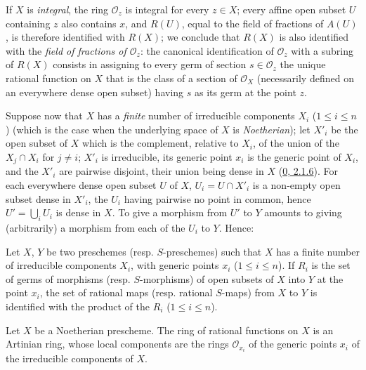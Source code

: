 If $X$ is \emph{integral}, the ring $\mathscr{O}_z$ is integral for every
$z\in X$; every affine open subset $U$ containing $z$ also contains $x$, and
$R(U)$, equal to the field of fractions of $A(U)$, is therefore identified
with $R(X)$; we conclude that $R(X)$ is also identified with the
\emph{field of fractions of $\mathscr{O}_z$}: the canonical identification of
$\mathscr{O}_z$ with a subring of $R(X)$ consists in assigning to every germ of
section $s\in\mathscr{O}_z$ the unique rational function on $X$ that is the
class of a section of $\mathscr{O}_X$ (necessarily defined on an everywhere
dense open subset) having $s$ as its germ at the point $z$.

\begin{env}[7.1.6]
\label{I.7.1.6}
Suppose now that $X$ has a \emph{finite} number of irreducible components
$X_i$ ($1\leq i\leq n$) (which is the case when the underlying space of $X$
is \emph{Noetherian}); let $X'_i$ be the open subset of $X$ which is the
complement, relative to $X_i$, of the union of the $X_j\cap X_i$ for
$j\neq i$; $X'_i$ is irreducible, its generic point $x_i$ is the generic point
of $X_i$, and the $X'_i$ are pairwise disjoint, their union being dense in $X$
(\hyperref[0.2.1.6]{0, 2.1.6}). For
each everywhere dense open subset $U$ of $X$, $U_i=U\cap X'_i$ is a non-empty
open subset dense in $X'_i$, the $U_i$ having pairwise no point in common,
hence $U'=\bigcup_i U_i$ is dense in $X$. To give a morphism from $U'$ to $Y$
amounts to giving (arbitrarily) a morphism from each of the $U_i$ to $Y$.
Hence:
\end{env}

\begin{proposition}[7.1.7]
\label{I.7.1.7}
Let $X$, $Y$ be two preschemes (resp. $S$-preschemes) such that $X$ has a
finite number of irreducible components $X_i$, with generic points $x_i$
($1\leq i\leq n$). If $R_i$ is the set of germs of morphisms (resp.
$S$-morphisms) of open subsets of $X$ into $Y$ at the point $x_i$, the set of
rational maps (resp. rational $S$-maps) from $X$ to $Y$ is identified with the
product of the $R_i$ ($1\leq i\leq n$).
\end{proposition}

\begin{corollary}[7.1.8]
\label{I.7.1.8}
Let $X$ be a Noetherian prescheme. The ring of rational functions on $X$ is
an Artinian ring, whose local components are the rings
$\mathscr{O}_{x_i}$ of the generic points $x_i$ of the irreducible components
of $X$.
\end{corollary}

